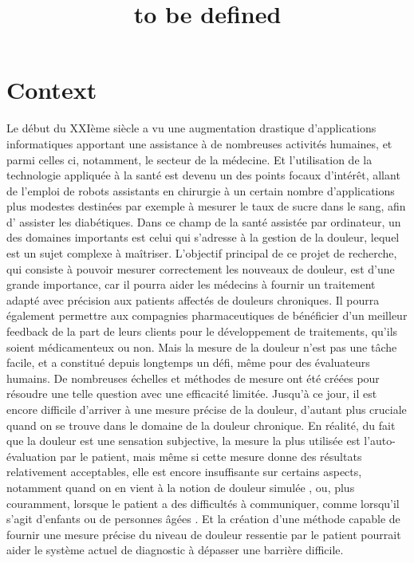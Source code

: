 \documentclass[11pt]{article}
\date{}
\title{to be defined}
\begin{document}
\maketitle

\section{Context}
\label{sec:orged2ba66}
Le début du XXIème siècle a vu une augmentation drastique d’applications informatiques
apportant une assistance à de nombreuses activités humaines, et parmi celles ci, notamment, le
secteur de la médecine. Et l’utilisation de la technologie appliquée à la santé est devenu un des
points focaux d’intérêt, allant de l’emploi de robots assistants en chirurgie à un certain nombre
d’applications plus modestes destinées par exemple à mesurer le taux de sucre dans le sang, afin d’
assister les diabétiques.
Dans ce champ de la santé assistée par ordinateur, un des domaines importants est celui qui
s’adresse à la gestion de la douleur, lequel est un sujet complexe à maîtriser. L’objectif principal de
ce projet de recherche, qui consiste à pouvoir mesurer correctement les nouveaux de douleur, est
d’une grande importance, car il pourra aider les médecins à fournir un traitement adapté avec
précision aux patients affectés de douleurs chroniques. Il pourra également permettre aux
compagnies pharmaceutiques de bénéficier d’un meilleur feedback de la part de leurs clients pour le
développement de traitements, qu’ils soient médicamenteux ou non.
Mais la mesure de la douleur n’est pas une tâche facile, et a constitué depuis longtemps un
défi, même pour des évaluateurs humains. De nombreuses échelles et méthodes de mesure ont été
créées pour résoudre une telle question \cite{wong1996wong,mccaffery1999pain,portenoy1996visual,melzack1975mcgill,galer1997development,gracely1988descriptor}
avec une efficacité limitée. Jusqu’à ce jour, il
est encore difficile d’arriver à une mesure précise de la douleur, d’autant plus cruciale quand on se
trouve dans le domaine de la douleur chronique.
En réalité, du fait que la douleur est une sensation subjective, la mesure la plus utilisée est
l’auto-évaluation par le patient, mais même si cette mesure donne des résultats relativement
acceptables, elle est encore insuffisante sur certains aspects, notamment quand on en vient à la
notion de douleur simulée \cite{gwen2007faces},
ou, plus couramment, lorsque le patient a des difficultés à communiquer,
comme lorsqu’il s’agit d’enfants ou de personnes âgées \cite{lucey2011automatically}.
Et la création d’une méthode capable de fournir une mesure précise du niveau de douleur
ressentie par le patient pourrait aider le système actuel de diagnostic à dépasser une barrière
difficile.
\end{document}
